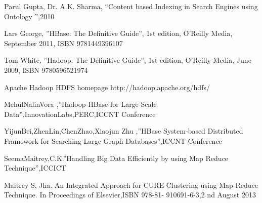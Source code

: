 
\begin{thebibliography}{00}

Parul Gupta, Dr. A.K. Sharma, “Content based Indexing in Search Engines using Ontology ”,2010

Lars George, ”HBase: The Definitive Guide”, 1st edition, O’Reilly Media, September 2011,   ISBN 9781449396107

Tom White, ”Hadoop: The Definitive Guide”, 1st edition, O’Reilly Media, June 2009, ISBN 9780596521974

Apache Hadoop HDFS homepage http://hadoop.apache.org/hdfs/

MehulNalinVora ,”Hadoop-HBase for Large-Scale Data”,InnovationLabs,PERC,ICCNT Conference

YijunBei,ZhenLin,ChenZhao,Xiaojun Zhu ,”HBase System-based Distributed Framework for Searching Large Graph Databases”,ICCNT Conference

SeemaMaitrey,C.K.”Handling Big Data Efficiently by using Map Reduce Technique”,ICCICT

Maitrey S, Jha. An Integrated Approach for CURE Clustering using Map-Reduce Technique. In Proceedings of Elsevier,ISBN 978-81- 910691-6-3,2 nd August 2013

\end{thebibliography}